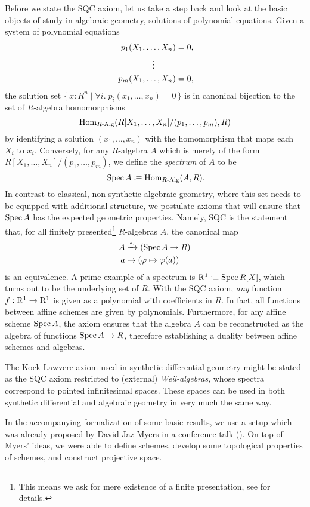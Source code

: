 Before we state the SQC axiom, let us take a step back and look at the basic objects of study in algebraic geometry,
solutions of polynomial equations.
Given a system of polynomial equations
\begin{align*}
  p_1(X_1, \dots, X_n) &= 0\rlap{,} \\
  \vdots\quad\quad\;\;   \\
  p_m(X_1, \dots, X_n) &= 0\rlap{,}
\end{align*}
the solution set
$\{\, x : R^n \mid \forall i.\; p_i(x_1, \dots, x_n) = 0 \,\}$
is in canonical bijection to the set of $R$-algebra homomorphisms
\[ \mathrm{Hom}_{R\text{-}\mathrm{Alg}}(R[X_1, \dots, X_n]/(p_1, \dots, p_m), R) \]
by identifying a solution $(x_1,\dots,x_n)$ with the homomorphism that maps each $X_i$ to $x_i$.
Conversely, for any $R$-algebra $A$ which is merely of the form $R[X_1, \dots, X_n]/(p_1, \dots, p_m)$,
we define the \emph{spectrum} of $A$ to be
\[
  \Spec A \colonequiv \Hom_{\Alg{R}}(A, R)
  \rlap{.}
\]
In contrast to classical, non-synthetic algebraic geometry,
where this set needs to be equipped with additional structure,
we postulate axioms that will ensure that $\operatorname{Spec} A$ has the expected geometric properties.
Namely, SQC is the statement that, for all finitely presented\footnote{This means we ask for mere existence of a finite presentation, see  for details.}
$R$-algebras $A$, the canonical map
  \begin{align*}
    A&\xrightarrow{\sim} (\operatorname{Spec} A\to R) \\
    a&\mapsto (\varphi\mapsto \varphi(a))
  \end{align*}
is an equivalence.
A prime example of a spectrum is $\mathrm{R}^1\vcentcolon\mspace{-1.2mu}\equiv \operatorname{Spec} R[X]$,
which turns out to be the underlying set of $R$.
With the SQC axiom,
\emph{any} function $f:\mathrm{R}^1\to \mathrm{R}^1$ is given as a polynomial with coefficients in $R$.
In fact, all functions between affine schemes are given by polynomials.
Furthermore, for any affine scheme $\operatorname{Spec} A$,
the axiom ensures that
the algebra $A$ can be reconstructed as the algebra of functions $\operatorname{Spec} A \to R$,
therefore establishing a duality between affine schemes and algebras.

The Kock-Lawvere axiom used in synthetic differential geometry
might be stated as the SQC axiom restricted to (external) \emph{Weil-algebras},
whose spectra correspond to pointed infinitesimal spaces.
These spaces can be used in both synthetic differential and algebraic geometry
in very much the same way.

In the accompanying formalization \cite{formalization} of some basic results,
we use a setup which was already proposed by David Jaz Myers
in a conference talk (\cite{myers-talk1, myers-talk2}).
On top of Myers' ideas,
we were able to define schemes, develop some topological properties of schemes,
and construct projective space.

